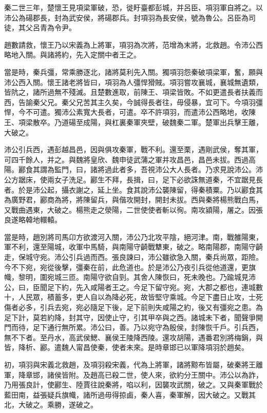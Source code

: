 秦二世三年，楚懷王見項梁軍破，恐，徙盱臺都彭城，并呂臣、項羽軍自將之。以沛公為碭郡長，封為武安侯，將碭郡兵。封項羽為長安侯，號為魯公。呂臣為司徒，其父呂青為令尹。

趙數請救，懷王乃以宋義為上將軍，項羽為次將，范增為末將，北救趙。令沛公西略地入關。與諸將約，先入定關中者王之。

當是時，秦兵彊，常乘勝逐北，諸將莫利先入關。獨項羽怨秦破項梁軍，奮，願與沛公西入關。懷王諸老將皆曰，項羽為人彊悍猾賊。項羽嘗攻襄城，襄城無遺類，皆阬之，諸所過無不殘滅。且楚數進取，前陳王、項梁皆敗。不如更遣長者扶義而西，告諭秦父兄。秦父兄苦其主久矣，今誠得長者往，毋侵暴，宜可下。今項羽彊悍，今不可遣。獨沛公素寬大長者，可遣。卒不許項羽，而遣沛公西略地，收陳王、項梁散卒。乃道碭至成陽，與杠裏秦軍夾壁，破魏秦二軍。楚軍出兵擊王離，大破之。

沛公引兵西，遇彭越昌邑，因與俱攻秦軍，戰不利。還至栗，遇剛武侯，奪其軍，可四千餘人，并之。與魏將皇欣、魏申徒武蒲之軍并攻昌邑，昌邑未拔。西過高陽。酈食其謂為監門，曰，諸將過此者多，吾視沛公大人長者。乃求見說沛公。沛公方踞床，使兩女子洗足。酈生不拜，長揖，曰，足下必欲誅無道秦，不宜踞見長者。於是沛公起，攝衣謝之，延上坐。食其說沛公襲陳留，得秦積粟。乃以酈食其為廣野君，酈商為將，將陳留兵，與偕攻開封，開封未拔。西與秦將楊熊戰白馬，又戰曲遇東，大破之。楊熊走之滎陽，二世使使者斬以徇。南攻潁陽，屠之。因張良遂略韓地轘轅。

當是時，趙別將司馬卬方欲渡河入關，沛公乃北攻平陰，絕河津。南，戰雒陽東，軍不利，還至陽城，收軍中馬騎，與南陽守齮戰犨東，破之。略南陽郡，南陽守齮走，保城守宛。沛公引兵過而西。張良諫曰，沛公雖欲急入關，秦兵尚眾，距險。今不下宛，宛從後擊，彊秦在前，此危道也。於是沛公乃夜引兵從他道還，更旗幟，黎明，圍宛城三匝。南陽守欲自剄。其舍人陳恢曰，死未晚也。乃踰城見沛公，曰，臣聞足下約，先入咸陽者王之。今足下留守宛。宛，大郡之都也，連城數十，人民眾，積蓄多，吏人自以為降必死，故皆堅守乘城。今足下盡日止攻，士死傷者必多，引兵去宛，宛必隨足下後，足下前則失咸陽之約，後又有彊宛之患。為足下計，莫若約降，封其守，因使止守，引其甲卒與之西。諸城未下者，聞聲爭開門而待，足下通行無所累。沛公曰，善。乃以宛守為殷侯，封陳恢千戶。引兵西，無不下者。至丹水，高武侯鰓、襄侯王陵降西陵。還攻胡陽，遇番君別將梅鋗，與皆，降析、酈。遣魏人甯昌使秦，使者未來。是時章邯已以軍降項羽於趙矣。

初，項羽與宋義北救趙，及項羽殺宋義，代為上將軍，諸將黥布皆屬，破秦將王離軍，降章邯，諸侯皆附。及趙高已殺二世，使人來，欲約分王關中。沛公以為詐，乃用張良計，使酈生、陸賈往說秦將，啗以利，因襲攻武關，破之。又與秦軍戰於藍田南，益張疑兵旗幟，諸所過毋得掠鹵，秦人喜，秦軍解，因大破之。又戰其北，大破之。乘勝，遂破之。

